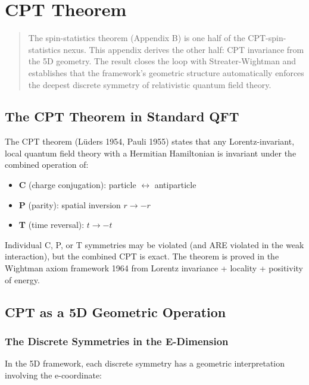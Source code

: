 \documentclass[aps,prd,preprint,superscriptaddress,longbibliography,floatfix]{revtex4-2}
\theoremstyle{remark}
\begin{document}
\section{CPT Theorem}


\begin{quote}
The spin-statistics theorem (Appendix B) is one half of the CPT-spin-statistics
nexus. This appendix derives the other half: CPT invariance from the 5D
geometry. The result closes the loop with Streater-Wightman and establishes
that the framework's geometric structure automatically enforces the deepest
discrete symmetry of relativistic quantum field theory.
\end{quote}



\subsection{The CPT Theorem in Standard QFT}

The CPT theorem (L\"{u}ders 1954, Pauli 1955) states that any Lorentz-invariant, local quantum field theory with a Hermitian Hamiltonian is invariant under the combined operation of:


\begin{itemize}
  \item \textbf{C} (charge conjugation): particle $\leftrightarrow$ antiparticle
  \item \textbf{P} (parity): spatial inversion $r \to -r$
  \item \textbf{T} (time reversal): $t \to -t$
\end{itemize}

Individual C, P, or T symmetries may be violated (and ARE violated in the weak interaction), but the combined CPT is exact. The theorem is proved in the Wightman axiom framework \cite{StreaterWightman1964} 1964 from Lorentz invariance + locality + positivity of energy.



\subsection{CPT as a 5D Geometric Operation}


\subsubsection{The Discrete Symmetries in the E-Dimension}

In the 5D framework, each discrete symmetry has a geometric interpretation involving the e-coordinate:
\end{document}
